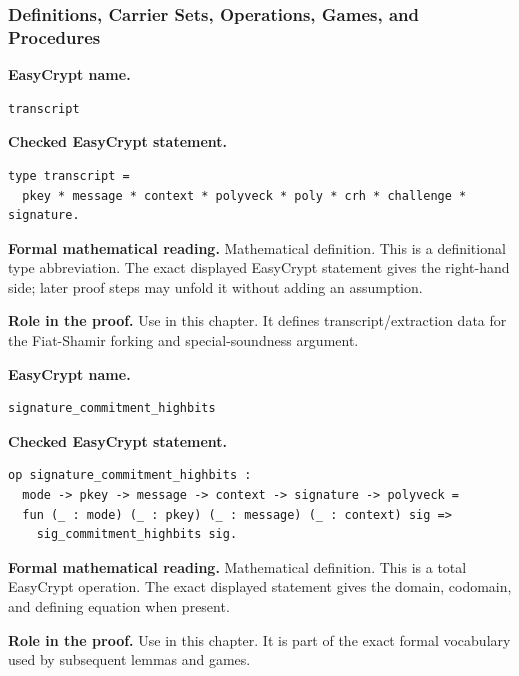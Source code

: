 \subsubsection*{Definitions, Carrier Sets, Operations, Games, and Procedures}
\begin{formaldefinition}
\noindent\textbf{EasyCrypt name.}
\begin{lstlisting}[language=EasyCrypt,basicstyle=\ttfamily\scriptsize]
transcript
\end{lstlisting}
\noindent\textbf{Checked EasyCrypt statement.}
\begin{lstlisting}[language=EasyCrypt,basicstyle=\ttfamily\scriptsize]
type transcript =
  pkey * message * context * polyveck * poly * crh * challenge * signature.
\end{lstlisting}
\noindent\textbf{Formal mathematical reading.}
Mathematical definition. This is a definitional type abbreviation.  The exact displayed EasyCrypt statement gives the right-hand side; later proof steps may unfold it without adding an assumption.

\noindent\textbf{Role in the proof.}
Use in this chapter. It defines transcript/extraction data for the Fiat-Shamir forking and special-soundness argument.

\end{formaldefinition}

\begin{formaldefinition}
\noindent\textbf{EasyCrypt name.}
\begin{lstlisting}[language=EasyCrypt,basicstyle=\ttfamily\scriptsize]
signature_commitment_highbits
\end{lstlisting}
\noindent\textbf{Checked EasyCrypt statement.}
\begin{lstlisting}[language=EasyCrypt,basicstyle=\ttfamily\scriptsize]
op signature_commitment_highbits :
  mode -> pkey -> message -> context -> signature -> polyveck =
  fun (_ : mode) (_ : pkey) (_ : message) (_ : context) sig =>
    sig_commitment_highbits sig.
\end{lstlisting}
\noindent\textbf{Formal mathematical reading.}
Mathematical definition. This is a total EasyCrypt operation.  The exact displayed statement gives the domain, codomain, and defining equation when present.

\noindent\textbf{Role in the proof.}
Use in this chapter. It is part of the exact formal vocabulary used by subsequent lemmas and games.

\end{formaldefinition}

